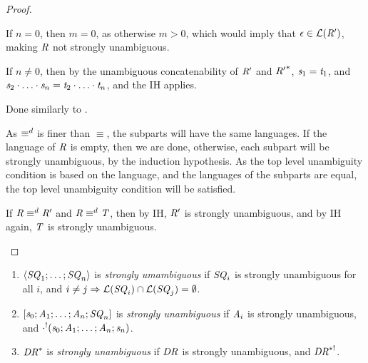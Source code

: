 \documentclass[numbers,10pt,preprint\ifanon ,nocopyrightspace\fi]{sigplanconf}
\begin{document}
\begin{proof}
\begin{case}
    If $n=0$, then $m=0$, as otherwise $m>0$, which would imply that
    $\epsilon\in\mathcal{L}(\mathit{R}')$, making $\mathit{R}$ not strongly
    unambiguous.

    If $n\neq 0$, then by the unambiguous concatenability of $\mathit{R}'$ and
    ${\mathit{R}'}^*$, $\mathit{s}_1 = \mathit{t}_1$, and
    $\mathit{s}_2\cdot\ldots\cdot\mathit{s}_n =
    \mathit{t}_2\cdot\ldots\cdot\mathit{t}_n$, and the IH applies.
  \end{case}

  \begin{case}
    Done similarly to \UnrollstarLeftRule{}.
  \end{case}

  \begin{case}
    As $\equiv^d$ is finer than $\equiv$, the subparts will have
    the same languages.  If the language of $\mathit{R}$ is empty, then we are done,
    otherwise, each subpart will be strongly unambiguous, by the induction
    hypothesis.  As the top
    level unambiguity condition is based on the language, and the languages of
    the subparts are equal, the top level unambiguity condition will be
    satisfied.
  \end{case}

  \begin{case}
    If $\mathit{R} \equiv^d \mathit{R}'$ and $\mathit{R} \equiv^d
    \mathit{T}$, then by IH,
    $\mathit{R}'$ is strongly unambiguous, and by IH again, $\mathit{T}$ is strongly
    unambiguous.
  \end{case}
\end{proof}

\begin{definition}
  \leavevmode
  \begin{enumerate}
  \item $\langle\mathit{SQ}_1;\ldots;\mathit{SQ}_n\rangle$ is \emph{strongly umambiguous}
    if $\mathit{SQ}_i$ is strongly unambiguous for all $i$, and $i\neq j
    \Rightarrow
    \mathcal{L}(\mathit{SQ}_i)\cap\mathcal{L}(\mathit{SQ}_j)=\emptyset$.
  \item $[\mathit{s}_0;\mathit{A}_1;\ldots;\mathit{A}_n;\mathit{SQ}_n]$ is
    \emph{strongly unambiguous} if $\mathit{A}_i$ is strongly unambiguous, and
    $\cdot^!(\mathit{s}_0;\mathit{A}_1;\ldots;\mathit{A}_n;\mathit{s}_n)$.
  \item ${\mathit{DR}}^*$ is \emph{strongly unambiguous} if $\mathit{DR}$ is
    strongly unambiguous, and $\mathit{DR}^{*!}$.
  \end{enumerate}
\end{definition}
\end{document}

